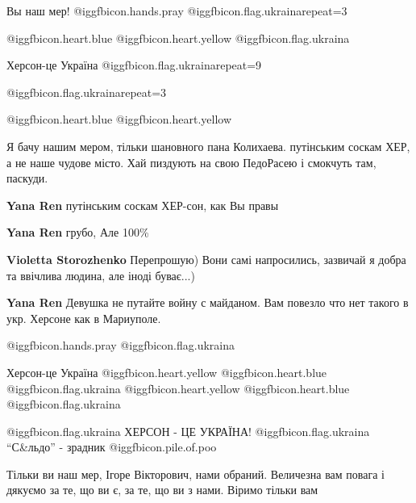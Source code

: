 \begin{itemize}
Вы наш мер! @igg{fbicon.hands.pray} @igg{fbicon.flag.ukraina}{repeat=3}

 @igg{fbicon.heart.blue}  @igg{fbicon.heart.yellow} @igg{fbicon.flag.ukraina}

Херсон-це Україна @igg{fbicon.flag.ukraina}{repeat=9}

@igg{fbicon.flag.ukraina}{repeat=3}

 @igg{fbicon.heart.blue}  @igg{fbicon.heart.yellow} 


Я бачу нашим мером, тільки шановного пана Колихаева. путінським соскам ХЕР, а
не наше чудове місто. Хай пиздують на свою ПедоРасею і смокчуть там, паскуди.

\begin{itemize} %
\textbf{Yana Ren} путінським соскам ХЕР-сон, как Вы правы

\textbf{Yana Ren} грубо, Але 100\%

\textbf{Violetta Storozhenko} Перепрошую) Вони самі напросились, зазвичай я добра та ввічлива людина, але іноді буває...)

\textbf{Yana Ren} Девушка не путайте войну с майданом. Вам повезло что нет такого в укр. Херсоне как в Мариуполе.
\end{itemize} %

 @igg{fbicon.hands.pray} @igg{fbicon.flag.ukraina}

Херсон-це Україна  @igg{fbicon.heart.yellow}  @igg{fbicon.heart.blue}  @igg{fbicon.flag.ukraina}  @igg{fbicon.heart.yellow}  @igg{fbicon.heart.blue}  @igg{fbicon.flag.ukraina}

@igg{fbicon.flag.ukraina} ХЕРСОН - ЦЕ УКРАЇНА! @igg{fbicon.flag.ukraina}  \enquote{С\&льдо} - зрадник @igg{fbicon.pile.of.poo} 


Тільки ви наш мер, Ігоре Вікторович, нами обраний. Величезна вам повага і
дякуємо за те, що ви є, за те, що ви з нами. Віримо тільки вам

\end{itemize} %
